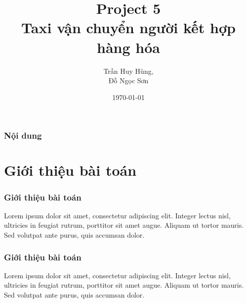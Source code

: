 \documentclass{beamer}
\title[Project 5]{Project 5 \\
	Taxi vận chuyển người kết hợp hàng hóa} %
\author{Trần Huy Hùng,\\ Đỗ Ngọc Sơn} %
\institute[UCLA] %
{
	Đại học Bách Khoa Hà Nội \\ %
	\medskip
}
\date{\today} %
\begin{document}
	
	\begin{frame}
		\titlepage %
	\end{frame}
	
	\begin{frame}
		\frametitle{Nội dung} %
		\tableofcontents %
	\end{frame}
	
	
	\section{Giới thiệu bài toán} %
	
	
	\begin{frame}
		\frametitle{Giới thiệu bài toán}
		Lorem ipsum dolor sit amet, consectetur adipiscing elit. Integer lectus nisl, ultricies in feugiat rutrum, porttitor sit amet augue. Aliquam ut tortor mauris. Sed volutpat ante purus, quis accumsan dolor.
	\end{frame}

	
	\begin{frame}
		\frametitle{Giới thiệu bài toán}
		Lorem ipsum dolor sit amet, consectetur adipiscing elit. Integer lectus nisl, ultricies in feugiat rutrum, porttitor sit amet augue. Aliquam ut tortor mauris. Sed volutpat ante purus, quis accumsan dolor.
	\end{frame}
	
\end{document}

